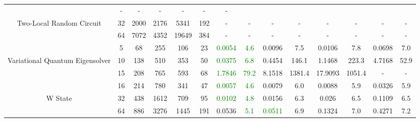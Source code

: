 \begin{table}[htb]
{\begin{tabular}{|c|c|c|c|c|c|c|c|c|c|c|c|c|c|}
 & - & -
 & - & -
 & - & -
 \\
Two-Local Random Circuit & 
32 & 2000 & 2176 & 5341 & 192
 & - & -
 & - & -
 & - & -
 & - & -
 \\
 & 
64 & 7072 & 4352 & 19649 & 384
 & - & -
 & - & -
 & - & -
 & - & -
 \\
\hline
 & 
5 & 68 & 255 & 106 & 23
 & \textcolor{green}{0.0054} & \textcolor{green}{4.6}
 & 0.0096 & 7.5
 & 0.0106 & 7.8
 & 0.0698 & 7.0
 \\
Variational Quantum Eigensolver & 
10 & 138 & 510 & 353 & 50
 & \textcolor{green}{0.0375} & \textcolor{green}{6.8}
 & 0.4454 & 146.1
 & 1.1468 & 223.3
 & 4.7168 & 52.9
 \\
 & 
15 & 208 & 765 & 593 & 68
 & \textcolor{green}{1.7846} & \textcolor{green}{79.2}
 & 8.1518 & 1381.4
 & 17.9093 & 1051.4
 & - & -
 \\
\hline
 & 
16 & 214 & 780 & 341 & 47
 & \textcolor{green}{0.0057} & \textcolor{green}{4.6}
 & 0.0079 & 6.0
 & 0.0088 & 5.9
 & 0.0326 & 5.9
 \\
W State & 
32 & 438 & 1612 & 709 & 95
 & \textcolor{green}{0.0102} & \textcolor{green}{4.8}
 & 0.0156 & 6.3
 & 0.026 & 6.5
 & 0.1109 & 6.5
 \\
 & 
64 & 886 & 3276 & 1445 & 191
 & 0.0536 & \textcolor{green}{5.1}
 & \textcolor{green}{0.0511} & 6.9
 & 0.1324 & 7.0
 & 0.4271 & 7.2
 \\
\hline
\end{tabular}}
\end{table}